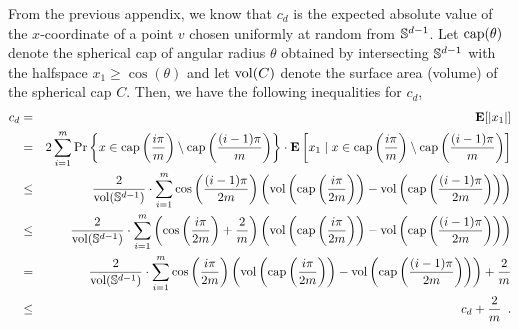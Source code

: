 \documentclass[charterfonts,lotsofwhite]{patmorin}
\newcommand{\E}{\mathbf{E}}
\begin{document}
From the previous appendix, we know that $c_d$ is the expected
absolute value of the $x$-coordinate of a point $v$ chosen uniformly
at random from $\mathbb{S}^{d-1}$.  Let $\mathrm{cap}(\theta)$ denote the spherical cap of
angular radius $\theta$ obtained by intersecting $\mathbb{S}^{d-1}$ with the
halfspace $x_1\ge\cos(\theta)$ and let $\mathrm{vol}(C)$ denote the surface
area (volume) of the spherical cap $C$.  Then, we have the following
inequalities for $c_d$,
\begin{eqnarray*}
   c_d & = & \E[|x_1|] \\ 
   & = & 2\sum_{i=1}^m \Pr\left\{x\in 
             \ccap\left(\frac{i\pi}{m}\right) \setminus
                  \ccap\left(\frac{(i-1)\pi}{m}\right)\right\}\cdot
              \E\left[x_1\mid x\in
              \ccap\left(\frac{i\pi}{m}\right) \setminus
                  \ccap\left(\frac{(i-1)\pi}{m}\right)
              \right] \\
   & \le & \frac{2}{\area(\Sd)}\cdot
                  \sum_{i=1}^m \cos\left(\frac{(i-1)\pi}{2m}\right)
                  \left(\area\left(\ccap\left(\frac{i\pi}{2m}\right)\right)-
                     \area\left(\ccap\left(\frac{(i-1)\pi}{2m}\right)\right)
                  \right) \\
   & \le & \frac{2}{\area(\Sd)}\cdot
                  \sum_{i=1}^m \left(\cos\left(\frac{i\pi}{2m}\right)+\frac{2}{m}\right)
                  \left(\area\left(\ccap\left(\frac{i\pi}{2m}\right)\right)-
                     \area\left(\ccap\left(\frac{(i-1)\pi}{2m}\right)\right)
                  \right) \\
   & = & \frac{2}{\area(\Sd)}\cdot
                  \sum_{i=1}^m \cos\left(\frac{i\pi}{2m}\right)
                  \left(\area\left(\ccap\left(\frac{i\pi}{2m}\right)\right)-
                     \area\left(\ccap\left(\frac{(i-1)\pi}{2m}\right)\right)
                  \right) + \frac{2}{m} \\
   & \le & c_d + \frac{2}{m}  \enspace .
\end{eqnarray*}
\end{document}
